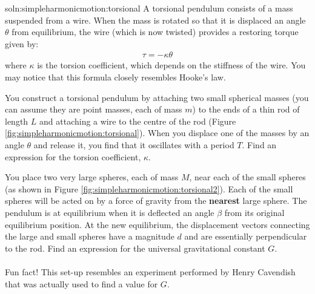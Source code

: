 \begin{problemParts}{soln:simpleharmonicmotion:torsional}{
\label{prob:simpleharmonicmotion:torsional} A torsional pendulum consists of a mass suspended from a wire. When the mass is rotated so that it is displaced an angle $\theta$ from equilibrium, the wire (which is now twisted) provides a restoring torque given by:
\begin{align*}
\tau=-\kappa\theta
\end{align*}
where $\kappa$ is the torsion coefficient, which depends on the stiffness of the wire. You may notice that this formula closely resembles Hooke's law.}
\item  You construct a torsional pendulum by attaching two small spherical masses (you can assume they are point masses, each of mass $m$) to the ends of a thin rod of length $L$ and attaching a wire to the centre of the rod (Figure \ref{fig:simpleharmonicmotion:torsional}). When you displace one of the masses by an angle $\theta$ and release it, you find that it oscillates with a period $T$. Find an expression for the torsion coefficient, $\kappa$. 
\item You place two very large spheres, each of mass $M$, near each of the small spheres (as shown in Figure \ref{fig:simpleharmonicmotion:torsional2}). Each of the small spheres will be acted on by a force of gravity from the \textbf{nearest} large sphere. The pendulum is at equilibrium when it is deflected an angle $\beta$ from its original equilibrium position. At the new equilibrium, the displacement vectors connecting the large and small spheres have a magnitude $d$ and are essentially perpendicular to the rod. Find an expression for the universal gravitational constant $G$. \\
\\
Fun fact! This set-up resembles an experiment performed by Henry Cavendish that was actually used to find a value for $G$.
\end{problemParts}

\newpage
